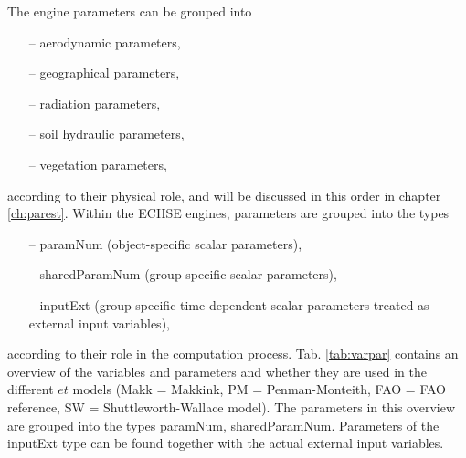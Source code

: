 \documentclass{scrreprt}
\begin{document}
The engine parameters can be grouped into
\begin{itemize}
  \item[--] aerodynamic parameters,
  \item[--] geographical parameters,
  \item[--] radiation parameters,
  \item[--] soil hydraulic parameters,
  \item[--] vegetation parameters,
\end{itemize}
%
according to their physical role, and will be discussed in this order in chapter \ref{ch:parest}.
Within the ECHSE engines, parameters are grouped into the types
\begin{itemize}
  \item[--] \textsf{paramNum} (object-specific scalar parameters),
  \item[--] \textsf{sharedParamNum} (group-specific scalar parameters),
  \item[--] \textsf{inputExt} (group-specific time-dependent scalar parameters treated as external input variables),
\end{itemize}
%
according to their role in the computation process.
Tab. \ref{tab:varpar} contains an overview of the variables and parameters and whether they are used in the different $et$ models (Makk = Makkink, PM = Penman-Monteith, FAO = FAO reference, SW = Shuttleworth-Wallace model).
The parameters in this overview are grouped into the types \textsf{paramNum}, \textsf{sharedParamNum}.
Parameters of the \textsf{inputExt} type can be found together with the actual external input variables.
\end{document}
